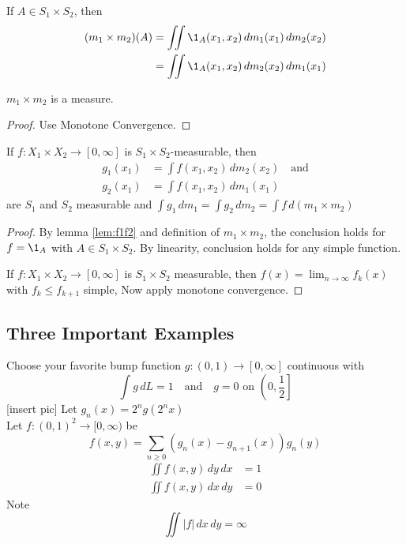 \begin{definition}\label{def:m1xm2}
	If $A \in S_1 \times S_2$, then
	\begin{align*}
		(m_1 \times m_2) (A) &= \iint \1_{A} (x_1, x_2) \, dm_1(x_1) \, dm_2(x_2) \\
							&= \iint \1_{A} (x_1, x_2) \, dm_2(x_2) \, dm_1(x_1)
	\end{align*}
\end{definition}

\begin{theorem}
	$m_1 \times m_2$ is a measure.
\end{theorem}

\begin{proof}
	Use Monotone Convergence.
\end{proof}

\begin{theorem}
	If $f:X_1 \times X_2 \to [0, \infty]$ is  $S_1 \times S_2$-measurable, then
	\begin{align*}
		g_1 (x_1) &= \int f(x_1, x_2) \, dm_2(x_2) \quad \text{and} \\
		g_2 (x_1) &= \int f(x_1, x_2) \, dm_1(x_1)
	\end{align*}
	are $S_1$ and $S_2$ measurable and $\int g_1 \, dm_1 = \int g_2 \, dm_2 = \int f \, d(m_1 \times m_2)$
\end{theorem}

\begin{proof}
	By lemma \ref{lem:f1f2} and definition of $m_1 \times m_2$, the conclusion holds for $f = \1_A$ with $A \in S_{1} \times S_2$.
	By linearity, conclusion holds for any simple function.

	If $f: X_1 \times X_2 \to [0,\infty]$ is  $S_1 \times S_2$ measurable, then $f(x) = \lim_{n\to \infty}f_k (x)$
	with $f_k \leq f_{k+1}$ simple, Now apply monotone convergence.
\end{proof}

\subsection{Three Important Examples}

\begin{example} Choose your favorite bump function $g: (0,1) \to [0,\infty]$ continuous with
	\[
		\int g \, dL = 1 \quad \text{and} \quad g = 0 \text{ on } \left(0, \frac{1}{2}\right]
	\]
	[insert pic]
	Let $g_n(x) = 2^n g(2^nx)$ \\
	Let $f:(0,1)^2 \to [0,\infty)	$ be
	\[
		f(x,y) = \sum_{n \geq 0} (g_n (x) - g_{n+1}(x)) g_n(y)
	\]
	\begin{align*}
		\iint f(x,y) \, dy \, dx &= 1 \\
		\iint f(x,y) \, dx \, dy &= 0
	\end{align*}
	Note
	\[
		\iint |f| \, dx \, dy = \infty
	\]
\end{example}

